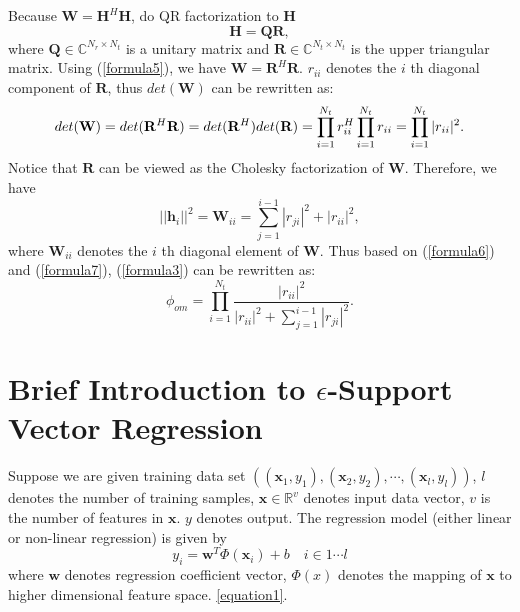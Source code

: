 \documentclass[12pt, draftclsnofoot, onecolumn]{IEEEtran}
\begin{document}
Because $\mathbf{W}=\mathbf{H}^{H}\mathbf{H}$, do QR factorization to $\mathbf{H}$ 
\begin{equation}
\mathbf{H}=\mathbf{Q}\mathbf{R},
\label{formula5} 
 \end{equation}
where $\mathbf{Q}\in\mathbb{C}^{N_{r}\times N_{t}}$ is a unitary matrix and $\mathbf{R}\in\mathbb{C}^{N_{t}\times N_{t}}$ is the upper triangular matrix. Using (\ref{formula5}), we have $\mathbf{W}=\mathbf{R}^{H}\mathbf{R}$. $r_{ii}$ denotes the $i$ th diagonal component of $\mathbf{R}$, thus $det(\mathbf{W})$ can be rewritten as:
\begin{equation}
det(\mathbf{W})=det(\mathbf{R}^{H}\mathbf{R})=det(\mathbf{R}^{H})det(\mathbf{R})\\=\prod_{i=1}^{N_{t}}r_{ii}^{H}\prod_{i=1}^{N_{t}}r_{ii}=\prod_{i=1}^{N_{t}}|r_{ii}|^{2}.
\label{formula6}
\end{equation}  
Notice that $\mathbf{R}$ can be viewed as the Cholesky factorization of $\mathbf{W}$. Therefore, we have
\begin{equation}
 ||\mathbf{h}_{i}||^{2}=\mathbf{W}_{ii}=\sum^{i-1}_{j=1}|r_{ji}|^{2}+|r_{ii}|^{2},
\label{formula7}
 \end{equation}
 where $\mathbf{W}_{ii}$ denotes the $i$ th diagonal element of $\mathbf{W}$.
 Thus based on (\ref{formula6}) and (\ref{formula7}), (\ref{formula3}) can be rewritten as:
\begin{equation}
\phi_{om}=\prod_{i=1}^{N_{t}}\frac{|r_{ii}|^{2}}{|r_{ii}|^{2}+\sum^{i-1}_{j=1}|r_{ji}|^{2}}.
\label{formula9}
\end{equation}  
\section{Brief Introduction to $\epsilon$-Support Vector Regression}\label{Introduce epsilon SVR}
Suppose we are given training data set $((\mathbf{x}_{1}, y_{1}),(\mathbf{x}_{2},y_{2}),\cdots,(\mathbf{x}_{l},y_{l}))$, $l$ denotes the number of training samples, $\mathbf{x}\in \mathbb{R}^{v}$ denotes input data vector, $v$ is the number of features in $\mathbf{x}$. $y$ denotes output. The regression model (either linear or non-linear regression) is given by 
\begin{equation}
y_{i}=\mathbf{w}^{T}\Phi(\mathbf{x}_{i})+b  \quad i\in 1\cdots l 
\label{equation1}
\end{equation} 
where $\mathbf{w}$ denotes regression coefficient vector, $\Phi(x)$ denotes the mapping of $\mathbf{x}$ to higher dimensional feature space. \ref{equation1}.
\end{document}
